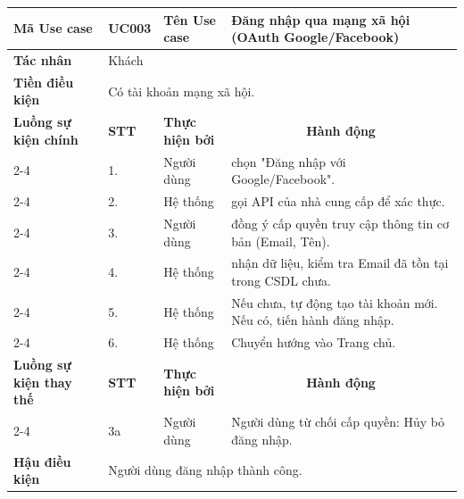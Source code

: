 \documentclass[../main.tex]{subfiles}
\begin{document}
\begin{longtable}{|p{2.7cm}|p{0.8cm}|p{2.6cm}|p{7.3cm}|}
\hline
\cellcolor[HTML]{D5F5E3}\textbf{Mã Use case} & \multicolumn{1}{l|}{UC003} & \cellcolor[HTML]{D5F5E3}\textbf{Tên Use case} & Đăng nhập qua mạng xã hội (OAuth Google/Facebook) \\ \hline
\cellcolor[HTML]{D5F5E3}\textbf{Tác nhân} & \multicolumn{3}{p{10.7cm}|}{Khách} \\ \hline
\cellcolor[HTML]{D5F5E3}\textbf{Tiền điều kiện} & \multicolumn{3}{p{10.7cm}|}{Có tài khoản mạng xã hội.} \\ \hline

\cellcolor[HTML]{D5F5E3}\textbf{Luồng sự kiện chính} & \cellcolor[HTML]{FDEBD0}\textbf{STT} & \cellcolor[HTML]{FDEBD0}\textbf{Thực hiện bởi} & \multicolumn{1}{c|}{\cellcolor[HTML]{FDEBD0}\textbf{Hành động}} \\ \cline{2-4} 
\cellcolor[HTML]{D5F5E3} & 1. & Người dùng & chọn "Đăng nhập với Google/Facebook". \\ \cline{2-4} 
\cellcolor[HTML]{D5F5E3} & 2. & Hệ thống & gọi API của nhà cung cấp để xác thực. \\ \cline{2-4} 
\cellcolor[HTML]{D5F5E3} & 3. & Người dùng & đồng ý cấp quyền truy cập thông tin cơ bản (Email, Tên). \\ \cline{2-4} 
\cellcolor[HTML]{D5F5E3} & 4. & Hệ thống & nhận dữ liệu, kiểm tra Email đã tồn tại trong CSDL chưa. \\ \cline{2-4} 
\cellcolor[HTML]{D5F5E3} & 5. & Hệ thống & Nếu chưa, tự động tạo tài khoản mới. Nếu có, tiến hành đăng nhập. \\ \cline{2-4} 
\cellcolor[HTML]{D5F5E3} & 6. & Hệ thống & Chuyển hướng vào Trang chủ. \\ \hline

\cellcolor[HTML]{D5F5E3}\textbf{Luồng sự kiện thay thế} & \cellcolor[HTML]{FDEBD0}\textbf{STT} & \cellcolor[HTML]{FDEBD0}\textbf{Thực hiện bởi} & \multicolumn{1}{c|}{\cellcolor[HTML]{FDEBD0}\textbf{Hành động}} \\ \cline{2-4} 
\cellcolor[HTML]{D5F5E3} & 3a & Người dùng & Người dùng từ chối cấp quyền: Hủy bỏ đăng nhập. \\ \hline

\cellcolor[HTML]{D5F5E3}\textbf{Hậu điều kiện} & \multicolumn{3}{p{10.7cm}|}{Người dùng đăng nhập thành công.} \\ \hline
\end{longtable}
\endgroup
\end{document}
